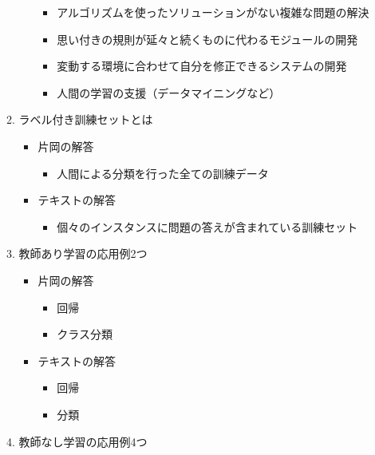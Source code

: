 \begin{itemize}
\begin{enumerate}
\begin{itemize}
      \begin{itemize}
      \tightlist
      \item
        アルゴリズムを使ったソリューションがない複雑な問題の解決
      \item
        思い付きの規則が延々と続くものに代わるモジュールの開発
      \item
        変動する環境に合わせて自分を修正できるシステムの開発
      \item
        人間の学習の支援（データマイニングなど）
      \end{itemize}
    \end{itemize}
  \item
    ラベル付き訓練セットとは

    \begin{itemize}
    \tightlist
    \item
      片岡の解答

      \begin{itemize}
      \tightlist
      \item
        人間による分類を行った全ての訓練データ
      \end{itemize}
    \item
      テキストの解答

      \begin{itemize}
      \tightlist
      \item
        個々のインスタンスに問題の答えが含まれている訓練セット
      \end{itemize}
    \end{itemize}
  \item
    教師あり学習の応用例2つ

    \begin{itemize}
    \tightlist
    \item
      片岡の解答

      \begin{itemize}
      \tightlist
      \item
        回帰
      \item
        クラス分類
      \end{itemize}
    \item
      テキストの解答

      \begin{itemize}
      \tightlist
      \item
        回帰
      \item
        分類
      \end{itemize}
    \end{itemize}
  \item
    教師なし学習の応用例4つ


\end{enumerate}
\end{itemize}
